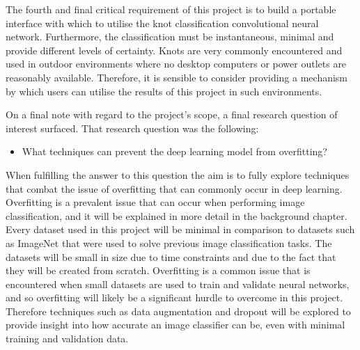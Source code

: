\documentclass{l4proj}
\begin{document}
The fourth and final critical requirement of this project is to build a portable interface with which to utilise the knot classification convolutional neural network.
Furthermore, the classification must be instantaneous, minimal and provide different levels of certainty.
Knots are very commonly encountered and used in outdoor environments where no desktop computers or power outlets are reasonably available. Therefore, it is sensible to consider providing a mechanism by which users can utilise the results of this project in such environments.

On a final note with regard to the project's scope, a final research question of interest surfaced.
That research question was the following:
\begin{itemize}
	\item What techniques can prevent the deep learning model from overfitting?
\end{itemize}
When fulfilling the answer to this question the aim is to fully explore techniques that combat the issue of overfitting that can commonly occur in deep learning.
Overfitting is a prevalent issue that can occur when performing image classification, and it will be explained in more detail in the background chapter.
Every dataset used in this project will be minimal in comparison to datasets such as ImageNet \cite{imagenet_cvpr09} that were used to solve previous image classification tasks.
The datasets will be small in size due to time constraints and due to the fact that they will be created from scratch.
Overfitting is a common issue that is encountered when small datasets are used to train and validate neural networks, and so overfitting will likely be a significant hurdle to overcome in this project. 
Therefore techniques such as data augmentation and dropout will be explored to provide insight into how accurate an image classifier can be, even with minimal training and validation data.  


\end{document}
